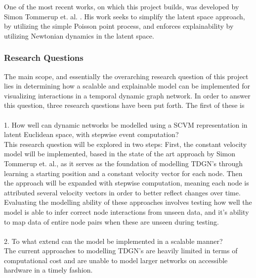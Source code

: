One of the most recent works, on which this project builds, was developed by Simon Tommerup et. al. \cite{Tommerup2021LearningNetworks}.
His work seeks to simplify the latent space approach, by utilizing the simple Poisson point process, and enforces explainability by utilizing Newtonian dynamics in the latent space.




\subsubsection{Research Questions} 
\label{sec:Intro:ResearchQs}
The main scope, and essentially the overarching research question of this project lies in determining how a scalable and explainable model can be implemented for visualizing interactions in a temporal dynamic graph network.
In order to answer this question, three research questions have been put forth.
The first of these is
\\\\
\hspace*{5mm} 1. How well can dynamic networks be modelled using a SCVM representation in latent Euclidean space, with stepwise event computation?
\\
This research question will be explored in two steps:
First, the constant velocity model will be implemented, based in the state of the art approach by Simon Tommerup et. al., as it serves as the foundation of modelling TDGN's through learning a starting position and a constant velocity vector for each node.
Then the approach will be expanded with stepwise computation, meaning each node is attributed several velocity vectors in order to better reflect changes over time.
\\
Evaluating the modelling ability of these approaches involves testing how well the model is able to infer correct node interactions from unseen data, and it's ability to map data of entire node pairs when these are unseen during testing.
\\\\
\hspace*{5mm} 2. To what extend can the model be implemented in a scalable manner?
\\
The current approaches to modelling TDGN's are heavily limited in terms of computational cost and are unable to model larger networks on accessible hardware in a timely fashion.
